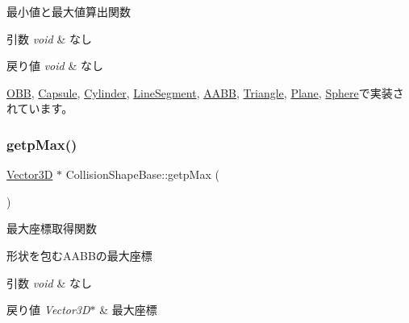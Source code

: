 最小値と最大値算出関数 


\begin{DoxyParams}{引数}
{\em void} & なし \\
\hline
\end{DoxyParams}

\begin{DoxyRetVals}{戻り値}
{\em void} & なし \\
\hline
\end{DoxyRetVals}


\mbox{\hyperlink{class_o_b_b_a638080ada1be9bef353359358dba23bc}{O\+BB}}, \mbox{\hyperlink{class_capsule_a52ada68cdb0c18a4dd8b4b169ad0d6df}{Capsule}}, \mbox{\hyperlink{class_cylinder_ac8fb25627ff41e9ae265cd80bfbde03a}{Cylinder}}, \mbox{\hyperlink{class_line_segment_aa680211e185d2c98febb5af5a6527496}{Line\+Segment}}, \mbox{\hyperlink{class_a_a_b_b_a9f2f03e02053b4f170fc030bdc4ba6b6}{A\+A\+BB}}, \mbox{\hyperlink{class_triangle_a8e8c4d3a0bb8a4dfb15429d38a3bdaaa}{Triangle}}, \mbox{\hyperlink{class_plane_a8df0a1a800b32aa21a2a22c7cb52aa86}{Plane}}, \mbox{\hyperlink{class_sphere_a651b659cec38a3a93a4be589f25899d7}{Sphere}}で実装されています。

\mbox{\label{class_collision_shape_base_aec0443ca3ada3e6fd6e9b23e2463c9c9}} 
\subsubsection{\texorpdfstring{getp\+Max()}{getpMax()}}
{\footnotesize\ttfamily \mbox{\hyperlink{class_vector3_d}{Vector3D}} $\ast$ Collision\+Shape\+Base\+::getp\+Max (\begin{DoxyParamCaption}{ }\end{DoxyParamCaption})}



最大座標取得関数 

形状を包む\+A\+A\+B\+Bの最大座標 
\begin{DoxyParams}{引数}
{\em void} & なし \\
\hline
\end{DoxyParams}

\begin{DoxyRetVals}{戻り値}
{\em Vector3\+D$\ast$} & 最大座標 \\
\hline
\end{DoxyRetVals}


